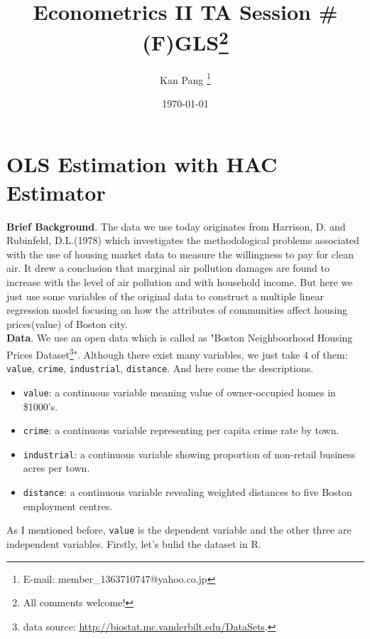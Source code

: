 \documentclass{article}
\title{Econometrics II TA Session \# (F)GLS\thanks{All comments welcome!}}
\author{Kan Pang \thanks{E-mail: member\_1363710747@yahoo.co.jp}}
\date{\today}
\theoremstyle{definition}
\providecommand{\tightlist}{%
	\setlength{\itemsep}{0pt}\setlength{\parskip}{0pt}}
\begin{document}
\maketitle
	
\tableofcontents
	
\newpage

\section{OLS Estimation with HAC Estimator}
\noindent \textbf{Brief Background}. The data we use today originates from Harrison, D. and Rubinfeld, D.L.(1978)\cite{Boston} which investigates the methodological problems associated with the use of housing market data to measure the willingness to pay for clean air. It drew a conclusion that marginal air pollution damages are found to increase with the level of air pollution and with household income. But here we just use some variables of the original data to construct a multiple linear regression model focusing on how the attributes of communities affect housing prices(value) of Boston city.\\

\noindent \textbf{Data}. We use an open data which is called as "Boston Neighboorhood Housing Prices Dataset\footnote{data source: \url{http://biostat.mc.vanderbilt.edu/DataSets}.}". Although there exist many variables, we just take 4 of them: \texttt{value}, \texttt{crime}, \texttt{industrial}, \texttt{distance}. And here come the descriptions.\\

\begin{itemize}
\tightlist
  \item
	\texttt{value}: a continuous variable meaning value of owner-occupied homes in \$1000's.
  \item
	\texttt{crime}: a continuous variable representing per capita crime rate by town.
  \item
	\texttt{industrial}: a continuous variable showing proportion of non-retail business acres per town.
  \item
	\texttt{distance}: a continuous variable revealing weighted distances to five Boston employment centres.
\end{itemize}

As I mentioned before, \texttt{value} is the  dependent variable and the other three are independent variables. Firstly, let's bulid the dataset in R.\\
\end{document}
